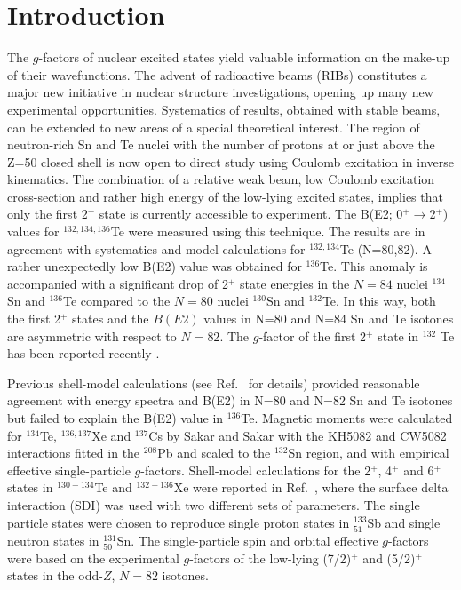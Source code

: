 \documentclass[aps,twocolumn,superscriptaddress,prc,showpacs]{revtex4}
\begin{document}
\section{Introduction}
 The $g$-factors of nuclear excited states yield valuable information on the
 make-up of their wavefunctions. The advent of radioactive beams (RIBs) constitutes a major new initiative in
 nuclear structure investigations, opening up many new
experimental opportunities. Systematics of results, obtained
with stable beams, can be extended to new areas of a special theoretical interest.
The region of neutron-rich Sn and Te nuclei with the number of protons at or just above the Z=50
closed shell is now open to direct study using Coulomb excitation in inverse kinematics.
The combination of a relative weak beam, low Coulomb excitation cross-section
and rather high energy of the low-lying excited states, implies that only
the first 2$^+$ state is currently accessible to experiment.
The B(E2; 0$^+\rightarrow$2$^+$) values for $^{132,134,136}$Te 
were measured \cite{rad02} using this technique. The results are in agreement
with systematics and model calculations for $^{132,134}$Te (N=80,82). A 
rather unexpectedly low B(E2) value was obtained for $^{136}$Te.
This anomaly is accompanied with a significant drop of 2$^+$ state energies in
the $N=84$ nuclei $^{134}$Sn and $^{136}$Te compared to the 
$N=80$ nuclei  $^{130}$Sn and $^{132}$Te.  
In this way, both the first 2$^+$ states and the $B(E2)$ values in N=80 and N=84 Sn and Te  
isotones are asymmetric with respect to $N=82$. 
The $g$-factor of the first 2$^+$ state in $^{132}$ Te has been reported recently \cite{ENAM}.

Previous shell-model calculations (see Ref.~\cite{rad02} for details) provided reasonable agreement
with energy spectra and B(E2) in N=80 and N=82 Sn and Te isotones but failed
to explain the B(E2) value in $^{136}$Te. Magnetic moments were calculated
for $^{134}$Te, $^{136,137}$Xe and $^{137}$Cs by  Sakar and Sakar \cite{sar01} with the
KH5082 and CW5082 interactions fitted in the $^{208}$Pb and scaled to the $^{132}$Sn region,
and with empirical effective single-particle $g$-factors.
Shell-model calculations for the 2$^+$, 4$^+$ and 6$^+$
states in $^{130-134}$Te and $^{132-136}$Xe were reported in Ref.~\cite{jak02},
where
the surface delta interaction (SDI) was used with two different sets of parameters.
The single particle states were chosen to reproduce single proton states in ${^{133}_{51}}$Sb  
and single neutron states in ${^{131}_{50}}$Sn. The single-particle spin and
orbital effective $g$-factors were based on the experimental $g$-factors
of the low-lying (7/2)$^+$ and (5/2)$^+$ states in the odd-$Z$, $N=82$ isotones.  
\end{document}
